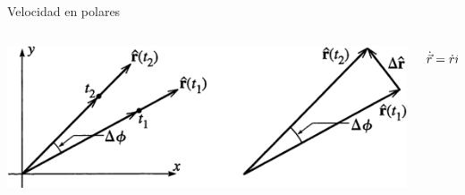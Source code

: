 \documentclass[serif]{beamer}
\newcommand{\highlight}[1]{%
  \colorbox{red!50}{$\displaystyle#1$}}
\begin{document}
\begin{frame}
\begin{block}{Velocidad en polares}
\begin{columns}[c]
	\begin{column}{0.55\textwidth}
		\includegraphics[width=\textwidth]{taylor1_12}
	\end{column}
  \begin{column}{0.45\textwidth}
		\alt<4>{
			\[
				\highlight{
					\dot{\vec{r}}= \dot{r} \hat{r} + r \dot{\phi} \hat{\phi}
				}
			\]
		}
		{
			\[
				\dot{\vec{r}}= \dot{r} \hat{r} + r \dv{\hat{r}}{t}
			\]
		}
		\onslide<2->{
			\[
				\Delta \hat{r} \sim \Delta \phi \hat{\phi} \sim \dot{\phi} \Delta t \hat{\phi}
			\]
		}
		\onslide<3->{
			\[
				\dv{\hat{r}}{t}= \lim_{\Delta t \to 0} \frac{\Delta \hat{r}}{\Delta t} =  \dot{\phi} \hat{\phi}
			\]
		}
	\end{column}
\end{columns}
\end{block}
\end{frame}
\end{document}
